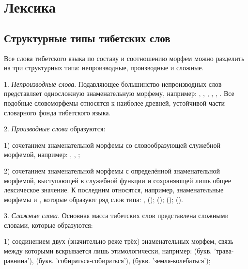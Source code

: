 \chapter{Лексика}

\section{Структурные типы тибетских слов}

Все слова тибетского языка по составу и соотношению морфем можно разделить на три структурных типа: непроизводные, производные и сложные.

1. \emph{Непроизводные слова}. Подавляющее большинство непроизводных слов представляет односложную знаменательную морфему, например: , , , , , . Все подобные словоморфемы относятся к наиболее древней, устойчивой части словарного фонда тибетского языка.

2. \emph{Производные слова} образуются:

1) сочетанием знаменательной морфемы со словообразующей служебной морфемой, например: , , ;

2) сочетанием знаменательной морфемы с определённой знаменательной морфемой, выступающей в служебной функции и сохраняющей лишь общее лексическое значение. К последним относятся, например, знаменательные морфемы  и , которые образуют ряд слов типа: , ();  ();	 (); 	 
().

3. \emph{Сложные слова}. Основная масса тибетских слов представлена сложными словами, которые образуются:

1) соединением двух (значительно реже трёх) знаменательных морфем, связь между которыми вскрывается лишь этимологически, например:  (букв. 'трава-равнина'),  (букв. 'собираться-собираться'),  (букв. 'земля-колебаться');

